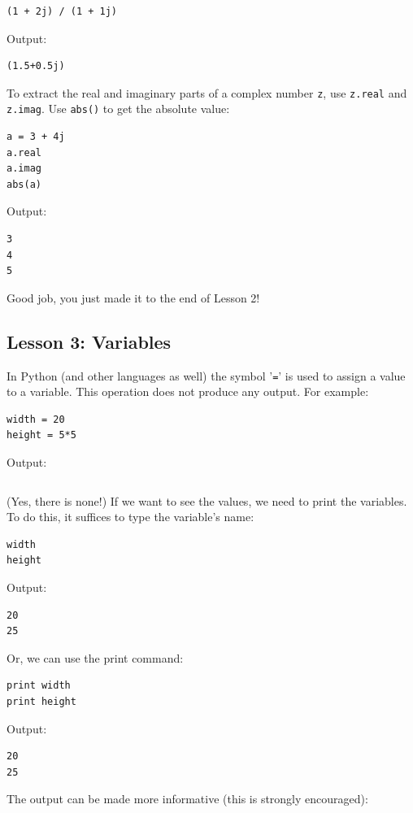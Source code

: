 \documentclass[article,A4,12pt]{llncs}
\begin{document}
\begin{verbatim}
(1 + 2j) / (1 + 1j)
\end{verbatim}
Output:

\begin{verbatim}
(1.5+0.5j)
\end{verbatim}
To extract the real and imaginary parts of a complex number {\tt z}, use {\tt z.real}
and {\tt z.imag}. Use {\tt abs()} to get the absolute value:

\begin{verbatim}
a = 3 + 4j
a.real
a.imag
abs(a)
\end{verbatim}
Output:

\begin{verbatim}
3
4
5
\end{verbatim}
Good job, you just made it to the end of Lesson 2!


\subsection{Lesson 3: Variables}

In Python (and other languages as well) the symbol '{\tt =}' is used to assign 
a value to a variable. This operation does not produce any output. For
example:

\begin{verbatim}
width = 20
height = 5*5
\end{verbatim}
Output:

\begin{verbatim}

\end{verbatim}
(Yes, there is none!) If we want to see the values, we need to print the 
variables. To do this, it suffices to type the variable's name:

\begin{verbatim}
width
height
\end{verbatim}
Output:

\begin{verbatim}
20
25
\end{verbatim}
Or, we can use the print command:

\begin{verbatim}
print width
print height
\end{verbatim}
Output:

\begin{verbatim}
20
25
\end{verbatim}
The output can be made more informative (this is strongly encouraged):
\end{document}
